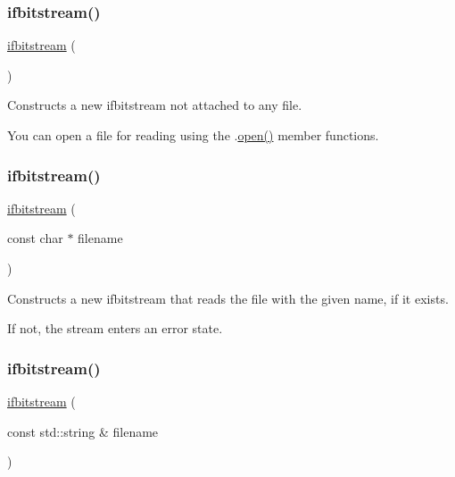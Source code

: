\subsubsection{\texorpdfstring{ifbitstream()}{ifbitstream()}\hspace{0.1cm}{\footnotesize\ttfamily [1/3]}}
{\footnotesize\ttfamily \mbox{\hyperlink{classifbitstream}{ifbitstream}} (\begin{DoxyParamCaption}{ }\end{DoxyParamCaption})}



Constructs a new ifbitstream not attached to any file. 

You can open a file for reading using the .\mbox{\hyperlink{classifbitstream_a57f80da790b202b27353cd8f8415b382}{open()}} member functions. \mbox{\label{classifbitstream_a5fe2eb72a345e67256791c172a29bbba}} 
\subsubsection{\texorpdfstring{ifbitstream()}{ifbitstream()}\hspace{0.1cm}{\footnotesize\ttfamily [2/3]}}
{\footnotesize\ttfamily \mbox{\hyperlink{classifbitstream}{ifbitstream}} (\begin{DoxyParamCaption}\item[{const char $\ast$}]{filename }\end{DoxyParamCaption})}



Constructs a new ifbitstream that reads the file with the given name, if it exists. 

If not, the stream enters an error state. \mbox{\label{classifbitstream_a96869868971e5d55945f1ab3d8bde584}} 
\subsubsection{\texorpdfstring{ifbitstream()}{ifbitstream()}\hspace{0.1cm}{\footnotesize\ttfamily [3/3]}}
{\footnotesize\ttfamily \mbox{\hyperlink{classifbitstream}{ifbitstream}} (\begin{DoxyParamCaption}\item[{const std\+::string \&}]{filename }\end{DoxyParamCaption})}



